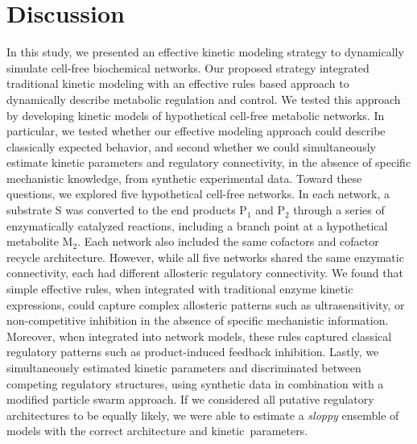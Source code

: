 \documentclass[processes,article,accept,moreauthors,pdftex,12pt,a4paper]{mdpi}
\begin{document}

\section{Discussion}

In this study, we presented an effective kinetic modeling strategy to dynamically simulate cell-free biochemical networks. 
Our proposed strategy integrated traditional kinetic modeling with an effective rules based approach to dynamically describe metabolic regulation and control. 
We tested this approach by developing kinetic models of hypothetical cell-free metabolic networks. 
In particular, we tested whether our effective modeling approach could describe classically expected behavior, and second whether we could simultaneously estimate kinetic parameters and regulatory connectivity, in the absence of specific mechanistic knowledge, from synthetic experimental data. 
Toward these questions, we explored five hypothetical cell-free networks. 
In each network, a substrate S was converted to the end products P$_{1}$ and P$_{2}$ through a series of enzymatically catalyzed reactions, including a branch point at a hypothetical metabolite M$_{2}$. 
Each network also included the same cofactors and cofactor recycle architecture. 
However, while all five networks shared the same enzymatic connectivity, each had different allosteric regulatory connectivity. 
We found that simple effective rules, when integrated with traditional enzyme kinetic expressions, could capture complex allosteric patterns such as ultrasensitivity, or non-competitive inhibition in the absence of specific mechanistic information. 
Moreover, when integrated into network models, these rules captured classical regulatory patterns such as product-induced feedback inhibition. 
Lastly, we simultaneously estimated kinetic parameters and discriminated between competing regulatory structures, using synthetic data in combination with a modified particle swarm approach.
If we considered all putative regulatory architectures to be equally likely, we were able to estimate a \textit{sloppy} ensemble of models with the correct architecture and \mbox{kinetic parameters.}
\end{document}

